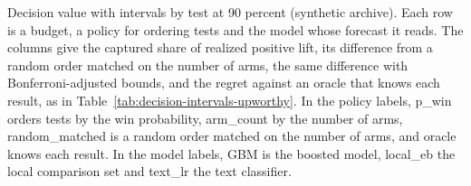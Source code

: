 \clearpage

\begin{table}[t]\centering\scriptsize
\caption{Decision value with intervals by test at 90 percent (synthetic archive). Each row is a budget, a policy for ordering tests and the model whose forecast it reads. The columns give the captured share of realized positive lift, its difference from a random order matched on the number of arms, the same difference with Bonferroni-adjusted bounds, and the regret against an oracle that knows each result, as in Table~\ref{tab:decision-intervals-upworthy}. In the policy labels, p\_win orders tests by the win probability, arm\_count by the number of arms, random\_matched is a random order matched on the number of arms, and oracle knows each result. In the model labels, GBM is the boosted model, local\_eb the local comparison set and text\_lr the text classifier.}
\label{tab:decision-intervals-synthetic}

\end{table}

\clearpage
